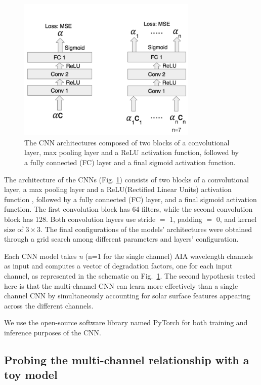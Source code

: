 \documentclass[twocolumn,usenames,dvipsnames]{aastex63}
\begin{document}
\begin{figure}[h]
    \centering
        \includegraphics[height=2.7in]{archs_combined.pdf}
        \caption{The CNN architectures composed of two blocks of a convolutional layer, max pooling layer and a ReLU activation function, followed by a fully connected (FC) layer and a final sigmoid activation function.}
        \label{fig:autocalibrate_CNN_arch}
\end{figure}
	
The architecture of the CNNs (Fig. \ref{fig:autocalibrate_CNN_arch}) consists of two blocks of a convolutional layer, a max pooling layer and a ReLU(Rectified Linear Units) activation function \citep{Nair:2010:RLU:3104322.3104425}, followed by a fully connected (FC) layer, and a final sigmoid activation function. The first convolution block has 64 filters, while the second convolution block has 128. Both convolution layers use stride $ = $ 1, padding $ = $ 0, and kernel size of $3\times3$. The final configurations of the models' architectures were obtained through a grid search among different parameters and layers' configuration. 

Each CNN model takes \textit{n} (n=1 for the single channel) AIA wavelength channels as input and computes a vector of degradation factors, one for each input channel, as represented in the schematic on  Fig.~\ref{fig:autocalibrate_CNN_arch}. The second hypothesis tested here is that the multi-channel CNN can learn more effectively than a single channel CNN by simultaneously accounting for solar surface features appearing across the different channels. 

We use the open-source software library named PyTorch \citep{paszke_2017} for both training and inference purposes of the CNN.

\subsection{Probing the multi-channel relationship with a toy model}
\end{document}
